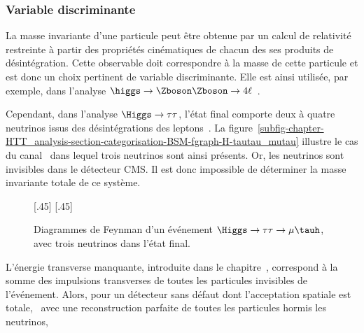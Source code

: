 \subsubsection{Variable discriminante}
La masse invariante d'une particule peut être obtenue par un calcul de relativité restreinte à partir des propriétés cinématiques de chacun des ses produits de désintégration.
Cette observable doit correspondre à la masse de cette particule et est donc un choix pertinent de variable discriminante.
Elle est ainsi utilisée, par exemple, dans l'analyse $\higgs\to\Zboson\Zboson\to4\ell$~\cite{CMS-PAS-HIG-13-002}.
\par
Cependant, dans l'analyse $\Higgs\to\tau\tau$, l'état final comporte deux à quatre neutrinos issus des désintégrations des leptons~\tau.
La figure~\ref{subfig-chapter-HTT_analysis-section-categorisation-BSM-fgraph-H-tautau_mutau} illustre le cas du canal \mu\tauh\ dans lequel trois neutrinos sont ainsi présents.
Or, les neutrinos sont invisibles dans le détecteur CMS.
Il est donc impossible de déterminer la masse invariante totale de ce système.
\begin{figure}[h]
\centering
\vspace{\baselineskip}

[.45\textwidth]
{\vspace{\baselineskip}}
\hfill
{}[.45\textwidth]
{\vspace{\baselineskip}}

\caption[Diagrammes de Feynman d'un événement $\Higgs\to\tau\tau\to\mu\tauh$.]{Diagrammes de Feynman d'un événement $\Higgs\to\tau\tau\to\mu\tauh$, avec trois neutrinos dans l'état final.}
\label{fig-chapter-HTT_analysis-section-categorisation-BSM-fgraph-H-tautau_mutau-for_mTtot}
\end{figure}
\par
L'énergie transverse manquante, introduite dans le chapitre~, correspond à la somme des impulsions transverses de toutes les particules invisibles de l'événement.
Alors, pour un détecteur sans défaut dont l'acceptation spatiale est totale,
\ie\ avec une reconstruction parfaite de toutes les particules hormis les neutrinos,
